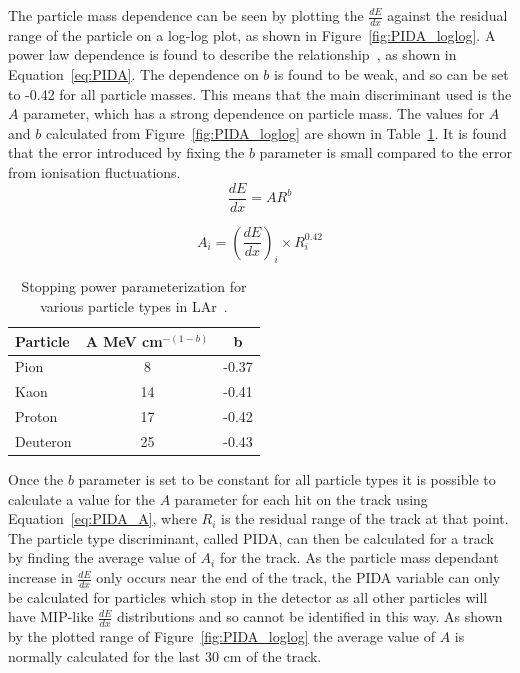 The particle mass dependence can be seen by plotting the $\frac{dE}{dx}$ against the residual range of the particle on a log-log plot, as shown in Figure~\ref{fig:PIDA_loglog}. A power law dependence is found to describe the relationship~\citep{PIDA_Paper}, as shown in Equation~\ref{eq:PIDA}. The dependence on $b$ is found to be weak, and so can be set to -0.42 for all particle masses. This means that the main discriminant used is the $A$ parameter, which has a strong dependence on particle mass. The values for $A$ and $b$ calculated from Figure~\ref{fig:PIDA_loglog} are shown in Table~\ref{tab:PIDAVals}. It is found that the error introduced by fixing the $b$ parameter is small compared to the error from ionisation fluctuations. \\

\begin{equation}
  \label{eq:PIDA}
  \frac{dE}{dx} = A R^b
\end{equation}

\begin{equation}
  \label{eq:PIDA_A}
  A_i = (\frac{dE}{dx})_i \times R^{0.42}_i
\end{equation}

\begin{table}
\caption[Stopping power parameterization for various particle types in liquid Argon]
        {Stopping power parameterization for various particle types in LAr~\citep{PIDA_Paper}.}
\centering
\label{tab:PIDAVals}
\begin{tabular}{l c c}
\toprule
{Particle} & {A MeV cm$^{-(1-b)}$} & {b} \\ 
\midrule
Pion     & 8  & -0.37 \\

Kaon     & 14 & -0.41 \\

Proton   & 17 & -0.42 \\

Deuteron & 25 & -0.43 \\
\bottomrule
\end{tabular}
\end{table}

Once the $b$ parameter is set to be constant for all particle types it is possible to calculate a value for the $A$ parameter for each hit on the track using Equation~\ref{eq:PIDA_A}, where $R_i$ is the residual range of the track at that point. The particle type discriminant, called PIDA, can then be calculated for a track by finding the average value of $A_i$ for the track. As the particle mass dependant increase in $\frac{dE}{dx}$ only occurs near the end of the track, the PIDA variable can only be calculated for particles which stop in the detector as all other particles will have MIP-like $\frac{dE}{dx}$ distributions and so cannot be identified in this way. As shown by the plotted range of Figure~\ref{fig:PIDA_loglog} the average value of $A$ is normally calculated for the last 30 cm of the track. \\

